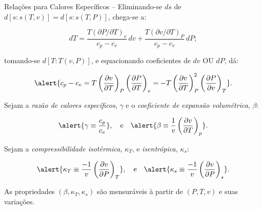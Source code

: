 \begin{frame}[allowframebreaks]{Relações para Calores Específicos --}
        \pagebreak
        Eliminando-se \alert{$ds$} de \alert{$d[s\!:\!s(T, v)] = d[s\!:\!s(T, P)]$}, chega-se a:

        \begin{equation*}
            dT =
                \frac{T(\partial P/\partial T)_v}{c_p - c_v}\,dv +
                \frac{T(\partial v/\partial T)_P}{c_p - c_v}\,dP;
        \end{equation*}\vspace*\medskipamount

        \noindent tomando-se \alert{$d[T\!:\!T(v, P)]$}, e equacionando coeficientes de
        \alert{$dv$} OU \alert{$dP$}, dá:

        \begin{equation*}
            \alert{
                c_p - c_v =
                    T\left(
                        \frac{\partial v}{\partial T}
                    \right)_P
                    \left(
                        \frac{\partial P}{\partial T}
                    \right)_v =
                    -T\left(
                        \frac{\partial v}{\partial T}
                    \right)_P^2
                    \left(
                        \frac{\partial P}{\partial v}
                    \right)_T
            }.
        \end{equation*}

        \pagebreak
        Sejam a \emph{razão de calores específicos}, \alert{$\gamma$} e o \emph{coeficiente de
        expansão volumétrica}, \alert{$\beta$}:

        \begin{equation*}
            \alert{\gamma \equiv \frac{c_p}{c_v}},
            \quad\mbox{e}\quad
            \alert{\beta \equiv \frac{1}{v}\left(\frac{\partial v}{\partial T}\right)_p}.
        \end{equation*}\vspace*\medskipamount

        Sejam a \emph{compressibilidade isotérmica}, \alert{$\kappa_T$}, e \emph{isentrópica},
        \alert{$\kappa_s$}:

        \begin{equation*}
            \alert{\kappa_T \equiv \frac{-1}{v}\left(\frac{\partial v}{\partial P}\right)_T},
            \quad\mbox{e}\quad
            \alert{\kappa_s \equiv \frac{-1}{v}\left(\frac{\partial v}{\partial P}\right)_s}.
        \end{equation*}\vspace*\medskipamount

        As propriedades \alert{$(\beta, \kappa_T, \kappa_s)$} são mensuráveis à partir de
        \alert{$(P, T, v)$} e suas variações.


\end{frame}
